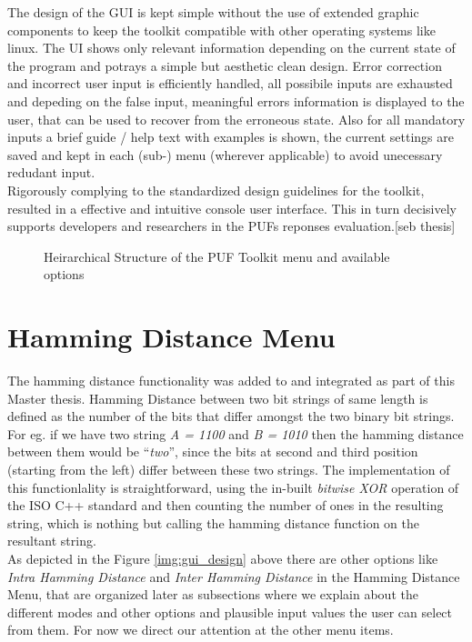 The design of the GUI is kept simple without the use of extended graphic components to keep the toolkit compatible with other operating systems like linux. The UI shows only relevant information depending on the current state of the program and potrays a simple but aesthetic clean design. Error correction and incorrect user input is efficiently handled, all possibile inputs are exhausted and depeding on the false input, meaningful errors information is displayed to the user, that can be used to
recover from the erroneous state. Also for all mandatory inputs a brief guide / help text with examples is shown, the current settings are saved and kept in each (sub-) menu (wherever applicable) to avoid unecessary redudant input.\\

Rigorously complying to the standardized design guidelines for the toolkit, resulted in a effective and intuitive console user interface.
This in turn decisively supports developers and researchers in the PUFs reponses evaluation.[seb thesis]

\begin{figure}
\centering
{}
\caption{Heirarchical Structure of the PUF Toolkit menu and available options}
\label{img:puf_menu}
\end{figure}

\section{Hamming Distance Menu}
\label{Hamming_Distance_menu}
The hamming distance functionality was added to and integrated as part of this Master thesis. Hamming Distance between two bit strings of same length is defined as the number of the bits that differ amongst the two binary bit strings. For eg. if we have two string \emph{A = 1100} and \emph{B = 1010} then the hamming distance between them would be ``\emph{two}'', since the bits at second and third position (starting from the left) differ between these two strings. The implementation of
this functionlality is straightforward, using the in-built \emph{bitwise XOR} operation of the ISO C++ standard and then counting the number of ones in the resulting string, which is nothing but calling the hamming distance function on the resultant string.\\

As depicted in the Figure \ref{img:gui_design} above there are other options like \emph{Intra Hamming Distance} and \emph{Inter Hamming Distance} in the Hamming Distance Menu, that are organized later as subsections where we explain about the different modes and other options and plausible input values the user can select from them. For now we direct our attention at the other menu items.\\

